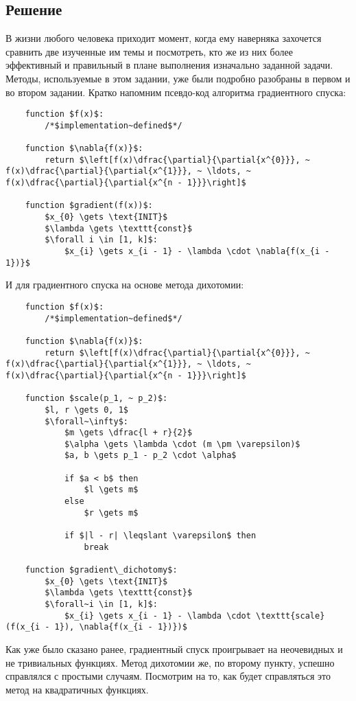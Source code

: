 \documentclass[12pt, a4paper, oneside, final]{article}
\begin{document}
	\subsection*{Решение}
	В жизни любого человека приходит момент, когда ему наверняка захочется сравнить две изученные им темы и посмотреть, кто же из них более эффективный и правильный в плане выполнения изначально заданной задачи. Методы, используемые в этом задании, уже были подробно разобраны в первом и во втором задании. Кратко напомним псевдо-код алгоритма градиентного спуска:
	\begin{lstlisting}
	function $f(x)$:
		/*$implementation~defined$*/

	function $\nabla{f(x)}$:
		return $\left[f(x)\dfrac{\partial}{\partial{x^{0}}}, ~ f(x)\dfrac{\partial}{\partial{x^{1}}}, ~ \ldots, ~ f(x)\dfrac{\partial}{\partial{x^{n - 1}}}\right]$

	function $gradient(f(x))$:
		$x_{0} \gets \text{INIT}$
		$\lambda \gets \texttt{const}$
		$\forall i \in [1, k]$:
		    $x_{i} \gets x_{i - 1} - \lambda \cdot \nabla{f(x_{i - 1})}$
	\end{lstlisting}
	И для градиентного спуска на основе метода дихотомии:
	\begin{lstlisting}
	function $f(x)$:
		/*$implementation~defined$*/

	function $\nabla{f(x)}$:
		return $\left[f(x)\dfrac{\partial}{\partial{x^{0}}}, ~ f(x)\dfrac{\partial}{\partial{x^{1}}}, ~ \ldots, ~ f(x)\dfrac{\partial}{\partial{x^{n - 1}}}\right]$

	function $scale(p_1, ~ p_2)$:
		$l, r \gets 0, 1$
		$\forall~\infty$:
			$m \gets \dfrac{l + r}{2}$
			$\alpha \gets \lambda \cdot (m \pm \varepsilon)$
			$a, b \gets p_1 - p_2 \cdot \alpha$

			if $a < b$ then
				$l \gets m$
			else
				$r \gets m$

			if $|l - r| \leqslant \varepsilon$ then
				break

	function $gradient\_dichotomy$:
		$x_{0} \gets \text{INIT}$
		$\lambda \gets \texttt{const}$
		$\forall~i \in [1, k]$:
			$x_{i} \gets x_{i - 1} - \lambda \cdot \texttt{scale}(f(x_{i - 1}), \nabla{f(x_{i - 1})})$
	\end{lstlisting}
	Как уже было сказано ранее, градиентный спуск проигрывает на неочевидных и не тривиальных функциях. Метод дихотомии же, по второму пункту, успешно справлялся с простыми случаям. Посмотрим на то, как будет справляться это метод на квадратичных функциях.
\end{document}
